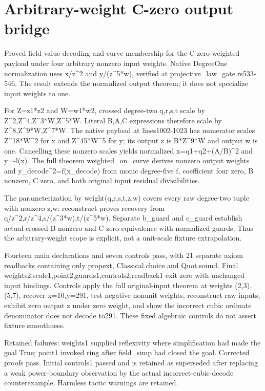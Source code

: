 \documentclass[11pt]{article}
\begin{document}
\sloppy
\section*{Arbitrary-weight C-zero output bridge}
Proved field-value decoding and curve membership for the C-zero weighted payload under four arbitrary nonzero input weights. Native DegreeOne normalization uses x/z\textasciicircum{}2 and y/(z\textasciicircum{}5*w), verified at projective\_law\_gate.rs533-546. The result extends the normalized output theorem; it does not specialize input weights to one.\par\medskip
For Z=z1*z2 and W=w1*w2, crossed degree-two q,r,s,t scale by Z\textasciicircum{}2,Z\textasciicircum{}4,Z\textasciicircum{}3*W,Z\textasciicircum{}5*W. Literal B,A,C expressions therefore scale by Z\textasciicircum{}8,Z\textasciicircum{}9*W,Z\textasciicircum{}7*W. The native payload at lines1002-1023 has numerator scales Z\textasciicircum{}18*W\textasciicircum{}2 for x and Z\textasciicircum{}45*W\textasciicircum{}5 for y; its output z is B*Z\textasciicircum{}9*W and output w is one. Cancelling these nonzero scales yields normalized x=q1+q2+(A/B)\textasciicircum{}2 and y=-l(x). The full theorem weighted\_on\_curve derives nonzero output weights and y\_decode\textasciicircum{}2=f(x\_decode) from monic degree-five f, coefficient four zero, B nonzero, C zero, and both original input residual divisibilities.\par\medskip
The parameterization by weight(q,r,s,t,z,w) covers every raw degree-two tuple with nonzero z,w: reconstruct proves recovery from q/z\textasciicircum{}2,r/z\textasciicircum{}4,s/(z\textasciicircum{}3*w),t/(z\textasciicircum{}5*w). Separate b\_guard and c\_guard establish actual crossed B-nonzero and C-zero equivalence with normalized guards. Thus the arbitrary-weight scope is explicit, not a unit-scale fixture extrapolation.\par\medskip
Fourteen main declarations and seven controls pass, with 21 separate axiom readbacks containing only propext, Classical.choice and Quot.sound. Final weights2,scale1,point2,guards1,controls2,readback1 exit zero with unchanged input bindings. Controls apply the full original-input theorem at weights (2,3),(5,7), recover x=10,y=291, test negative nonunit weights, reconstruct raw inputs, exhibit zero output z under zero weight, and show the incorrect cubic ordinate denominator does not decode to291. These fixed algebraic controls do not assert fixture smoothness.\par\medskip
Retained failures: weights1 supplied reflexivity where simplification had made the goal True; point1 invoked ring after field\_simp had closed the goal. Corrected proofs pass. Initial controls1 passed and is retained as superseded after replacing a weak power-boundary observation by the actual incorrect-cubic-decode counterexample. Harmless tactic warnings are retained.\par\medskip
\end{document}
